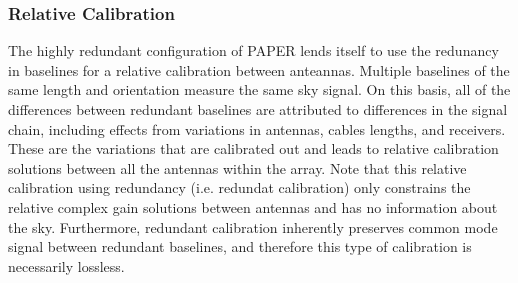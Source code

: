 \documentclass[twocolumn,numberedappendix]{emulateapj} \shorttitle{PSA64}
\begin{document}
\subsubsection{Relative Calibration}
%         
%

The highly redundant configuration of PAPER lends itself to
use the redunancy in baselines for a relative calibration between anteannas.
Multiple baselines of the same length and orientation measure the same sky
signal. On this basis, all of the differences between redundant baselines are
attributed to differences in the signal chain, including effects from variations
in antennas, cables lengths, and receivers. These are the variations that are
calibrated out and leads to relative calibration solutions between all the
antennas within the array.  Note that this relative calibration using redundancy
(i.e. redundat calibration) only constrains the relative complex gain solutions
between antennas and has no information about the sky. Furthermore, redundant
calibration inherently preserves common mode signal between redundant baselines,
and therefore this type of calibration is necessarily lossless. 
\end{document}
